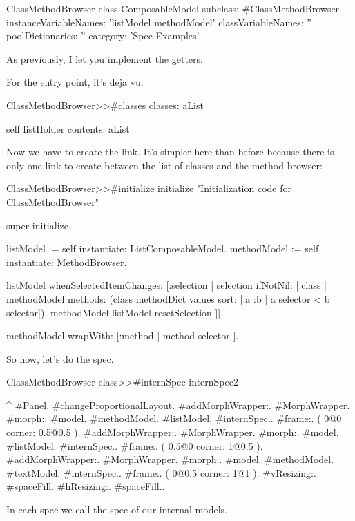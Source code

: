 \documentclass[a4paper,10pt,twoside]{book}
\begin{document}
\begin{classdef}{ClassMethodBrowser class}
ComposableModel subclass: #ClassMethodBrowser
	instanceVariableNames: 'listModel methodModel'
	classVariableNames: ''
	poolDictionaries: ''
	category: 'Spec-Examples'
\end{classdef}

As previously, I let you implement the getters.

For the entry point, it's deja vu: 
\begin{method}{ClassMethodBrowser>>\#classes}
classes: aList

	self listHolder contents: aList
\end{method}

Now we have to create the link. It's simpler here than before because there is only one link to create between the list of classes and the method browser:

\begin{method}{ClassMethodBrowser>>\#initialize}
initialize
	"Initialization code for ClassMethodBrowser"

	super initialize.

	listModel := self instantiate: ListComposableModel.
	methodModel := self instantiate: MethodBrowser.
	
	listModel whenSelectedItemChanges: [:selection |
		selection 
			ifNotNil: [:class | 
				methodModel methods: (class methodDict values sort: [:a :b | a selector < b selector]).
				methodModel listModel resetSelection ]].
	
	methodModel wrapWith: [:method | method selector ].
\end{method}

So now, let's do the spec. 
\begin{method}{ClassMethodBrowser class>>\#internSpec}
internSpec2

	^ { #Panel.
			#changeProportionalLayout.
			#addMorphWrapper:.	
				{	#MorphWrapper.
									#morph:. 	{#model. #methodModel. #listModel. #internSpec.}.
									#frame:. 	( 0@0 corner: 0.5@0.5 )}.
			#addMorphWrapper:.	
				{	#MorphWrapper.
									#morph:. 	{#model. #listModel. #internSpec.}.
									#frame:. 	( 0.5@0 corner: 1@0.5 )}.
			#addMorphWrapper:.	
				{	#MorphWrapper.
									#morph:. 	{#model. #methodModel. #textModel. #internSpec.}.
									#frame:.	( 0@0.5 corner: 1@1 )}.
			#vResizing:. #spaceFill.
			#hResizing:. #spaceFill.}.
\end{method}
In each spec we call the spec of our internal models.
\end{document}
